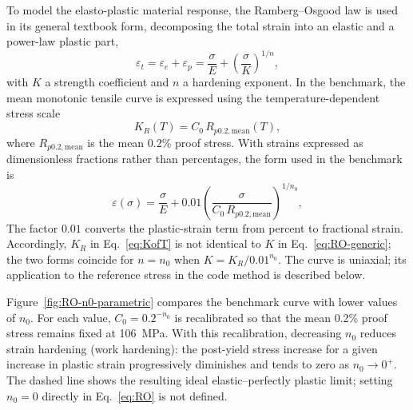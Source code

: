\documentclass[10pt,a4paper]{article}
\begin{document}
To model the elasto-plastic material response, the Ramberg--Osgood law is used in its general textbook form, decomposing the total strain into an elastic and a power-law plastic part,
\begin{equation}
\varepsilon_t = \varepsilon_e + \varepsilon_p = \frac{\sigma}{E} + \left(\frac{\sigma}{K}\right)^{1/n},
\label{eq:RO-generic}
\end{equation}
with $K$ a strength coefficient and $n$ a hardening exponent. In the benchmark, the mean monotonic tensile curve is expressed using the temperature-dependent stress scale
\begin{equation}
K_R(T) = C_0\,R_{p0.2,\mathrm{mean}}(T),
\label{eq:KofT}
\end{equation}
where $R_{p0.2,\mathrm{mean}}$ is the mean 0.2\% proof stress. With strains expressed as dimensionless fractions rather than percentages, the form used in the benchmark is
\begin{equation}
\varepsilon(\sigma) = \frac{\sigma}{E} + 0.01\left(\frac{\sigma}{C_0\,R_{p0.2,\mathrm{mean}}}\right)^{1/n_0},
\label{eq:RO}
\end{equation}
The factor $0.01$ converts the plastic-strain term from percent to fractional strain. Accordingly, $K_R$ in Eq.~\eqref{eq:KofT} is not identical to $K$ in Eq.~\eqref{eq:RO-generic}; the two forms coincide for $n=n_0$ when $K=K_R/0.01^{n_0}$. The curve is uniaxial; its application to the reference stress in the code method is described below.

Figure~\ref{fig:RO-n0-parametric} compares the benchmark curve with lower values of $n_0$. For each value, $C_0=0.2^{-n_0}$ is recalibrated so that the mean 0.2\% proof stress remains fixed at \SI{106}{MPa}. With this recalibration, decreasing $n_0$ reduces strain hardening (work hardening): the post-yield stress increase for a given increase in plastic strain progressively diminishes and tends to zero as $n_0\to0^+$. The dashed line shows the resulting ideal elastic--perfectly plastic limit; setting $n_0=0$ directly in Eq.~\eqref{eq:RO} is not defined.
\end{document}
